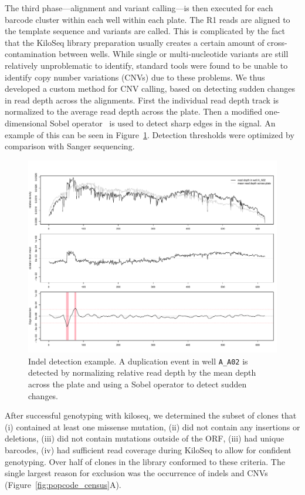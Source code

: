 The third phase---alignment and variant calling---is then executed for each barcode cluster within each well within each plate. The R1 reads are aligned to the template sequence and variants are called. This is complicated by the fact that the KiloSeq library preparation usually creates a certain amount of cross-contamination between wells. While single or multi-nucleotide variants are still relatively unproblematic to identify, standard tools were found to be unable to identify copy number variations (CNVs) due to these problems. We thus developed a custom method for CNV calling, based on detecting sudden changes in read depth across the alignments. First the individual read depth track is normalized to the average read depth across the plate. Then a modified one-dimensional Sobel operator~\cite{sobel_3x3_1968} is used to detect sharp edges in the signal. An example of this can be seen in Figure~\ref{fig:border_detect}. Detection thresholds were optimized by comparison with Sanger sequencing.

\begin{figure}[h!]
	\centering
	\includegraphics[width=\textwidth]{img/border_detect.pdf}
	\caption{Indel detection example. A duplication event in well \texttt{A\_A02} is detected by normalizing relative read depth by the mean depth across the plate and using a Sobel operator to detect sudden changes.}
	\label{fig:border_detect}
\end{figure}


After successful genotyping with kiloseq, we determined the subset of clones that (i) contained at least one missense mutation, (ii) did not contain any insertions or deletions, (iii) did not contain mutations outside of the ORF, (iii) had unique barcodes, (iv) had sufficient read coverage during KiloSeq to allow for confident genotyping.
Over half of clones in the library conformed to these criteria. The single largest reason for exclusion was the occurrence of indels and CNVs (Figure~\ref{fig:popcode_census}A). 

